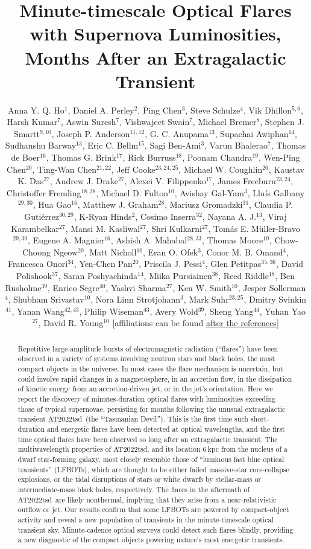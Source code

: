 \documentclass{nature_plusfigure}
\title{Minute-timescale Optical Flares with Supernova Luminosities, Months After an Extragalactic Transient}
\author{Anna Y. Q. Ho$^{1}$, Daniel A. Perley$^{2}$, Ping Chen$^{3}$, Steve Schulze$^{4}$, Vik Dhillon$^{5,6}$, Harsh Kumar$^{7}$, Aswin Suresh$^{7}$, Vishwajeet Swain$^{7}$, Michael Bremer$^{8}$, Stephen J. Smartt$^{9,10}$, Joseph P. Anderson$^{11,12}$, G. C. Anupama$^{13}$, Supachai Awiphan$^{14}$, Sudhanshu Barway$^{13}$, Eric C. Bellm$^{15}$, Sagi Ben-Ami$^{3}$, Varun Bhalerao$^{7}$, Thomas de Boer$^{16}$, Thomas G. Brink$^{17}$, Rick Burruss$^{18}$, Poonam Chandra$^{19}$, Wen-Ping Chen$^{20}$, Ting-Wan Chen$^{21,22}$, Jeff Cooke$^{23,24,25}$, Michael W. Coughlin$^{26}$, Kaustav K. Das$^{27}$, Andrew J. Drake$^{27}$, Alexei V. Filippenko$^{17}$, James Freeburn$^{23,24}$, Christoffer Fremling$^{18,28}$, Michael D. Fulton$^{10}$, Avishay Gal-Yam$^{3}$, Llu\'is Galbany$^{29,30}$, Hua Gao$^{16}$, Matthew J. Graham$^{28}$, Mariusz Gromadzki$^{31}$, Claudia P. Guti\'errez$^{30,29}$, K-Ryan Hinds$^{2}$, Cosimo Inserra$^{32}$, Nayana A. J.$^{13}$, Viraj Karambelkar$^{27}$, Mansi M. Kasliwal$^{27}$, Shri Kulkarni$^{27}$, Tom\'as E. M\"uller-Bravo$^{29,30}$, Eugene A. Magnier$^{16}$, Ashish A. Mahabal$^{28,33}$, Thomas Moore$^{10}$, Chow-Choong Ngeow$^{20}$, Matt Nicholl$^{10}$, Eran O. Ofek$^{3}$, Conor M. B. Omand$^{4}$, Francesca Onori$^{34}$, Yen-Chen Pan$^{20}$, Priscila J. Pessi$^{4}$, Glen Petitpas$^{35,36}$, David Polishook$^{37}$, Saran Poshyachinda$^{14}$, Miika Pursiainen$^{38}$, Reed Riddle$^{18}$, Ben Rusholme$^{39}$, Enrico Segre$^{40}$, Yashvi Sharma$^{27}$, Ken W. Smith$^{10}$, Jesper Sollerman$^{4}$, Shubham Srivastav$^{10}$, Nora Linn Strotjohann$^{3}$, Mark Suhr$^{23,25}$, Dmitry Svinkin$^{41}$, Yanan Wang$^{42,43}$, Philip Wiseman$^{43}$, Avery Wold$^{39}$, Sheng Yang$^{44}$, Yuhan Yao$^{27}$, David R. Young$^{10}$
[affiliations can be found \hyperref[sec:affiliations]{after the references}]
	}
\newcommand{\at}{AT2022tsd}
\begin{document}
\maketitle

\begin{abstract}

Repetitive large-amplitude bursts of electromagnetic radiation (``flares'') have been observed in a variety of systems involving neutron stars and black holes\cite{Fender1997,Hurley1999,Marrone2008,Racusin2008,Kasliwal2008,CastroTirado2008,Stefanescu2008,Nesci2021}, the most compact objects in the universe. In most cases the flare mechanism is uncertain, but could involve rapid changes in a magnetosphere\cite{Hurley1999,CastroTirado2008,Stefanescu2008}, in an accretion flow\cite{Fender2004,Yuan2014}, in the dissipation of kinetic energy from an accretion-driven jet\cite{Racusin2008}, or in the jet's orientation\cite{Raiteri2017}.
Here we report the discovery of minutes-duration optical flares with luminosities exceeding those of typical supernovae, persisting for months following the unusual extragalactic transient \at\ (the ``Tasmanian Devil'').
This is the first time such short-duration and energetic flares have been detected at optical wavelengths, and the first time optical flares have been observed so long after an extragalactic transient.
The multiwavelength properties of \at, and its location 6\,kpc from the nucleus of a dwarf star-forming galaxy, most closely resemble those of ``luminous fast blue optical transients'' (LFBOTs\cite{Greiner2015,Prentice2018,RiveraSandoval2018,Perley2019,Margutti2019,Ho2019,Coppejans2020,Ho2020_Koala,Perley2021,Bright2022,Ho2022_AT2020xnd,Yao2022}), which are thought to be either failed massive-star core-collapse explosions\cite{Prentice2018,Margutti2019,Perley2019}, or the tidal disruptions of stars\cite{Metzger2022} or white dwarfs\cite{Kuin2019,Perley2019} by stellar-mass or intermediate-mass black holes, respectively. The flares in the aftermath of \at\ are likely nonthermal, implying that they arise from a near-relativistic outflow or jet. %
Our results confirm that some LFBOTs are powered by compact-object activity
and reveal a new population of transients in the minute-timescale optical transient sky.
Minute-cadence optical surveys\cite{Ofek2023,Law2022} could detect such flares blindly,
providing a new diagnostic of the compact objects powering nature's most energetic transients.

\end{abstract}
\end{document}
